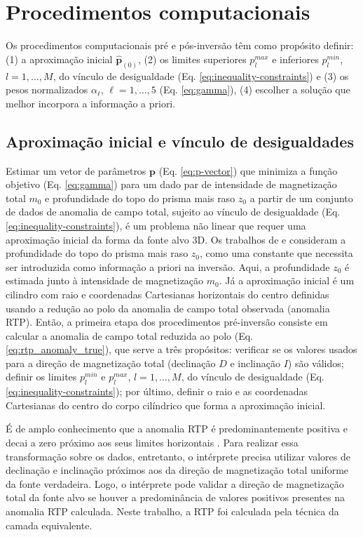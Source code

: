 \chapter{Procedimentos computacionais}

Os procedimentos computacionais pré e pós-inversão têm como propósito definir: (1) a aproximação inicial $ \hat{\mathbf{p}}_{(0)} $, (2) os limites superiores $ p_l^{max} $ e inferiores $ p_l^{min} $, $ l=1, \dots, M $, do vínculo de desigualdade (Eq. \ref{eq:inequality-constraints}) e (3) os pesos normalizados $ \alpha_{\ell} $, $ \ell=1,\dots,5 $ (Eq. \ref{eq:gamma}), (4) escolher a solução que melhor incorpora a informação a priori. 

\section{Aproximação inicial e vínculo de desigualdades}

Estimar um vetor de parâmetros $\mathbf{p}$ (Eq. \ref{eq:p-vector}) que minimiza a função objetivo (Eq. \ref{eq:gamma}) para um dado par de intensidade de magnetização total $ m_0 $ e profundidade do topo do prisma mais raso $ z_0 $ a partir de um conjunto de dados de anomalia de campo total, sujeito ao vínculo de desigualdade (Eq. \ref{eq:inequality-constraints}), é um problema não linear que requer uma aproximação inicial da forma da fonte alvo 3D. 
Os trabalhos de \cite{oliveirajr_etal2011} e \cite{oliveirajr_barbosa2013} consideram a profundidade do topo do prisma mais raso $ z_0 $, como uma constante que necessita ser introduzida como informação a priori na inversão.
Aqui, a profundidade $ z_0 $ é estimada junto à intensidade de magnetização $ m_0 $.
Já a aproximação inicial
é um cilindro com raio e coordenadas Cartesianas horizontais do centro definidas usando a redução ao polo da anomalia de campo total observada (anomalia RTP).
Então, a primeira etapa dos procedimentos pré-inversão consiste em calcular a anomalia de campo total reduzida ao polo (Eq. \ref{eq:rtp_anomaly_true}), que serve a três propósitos: verificar se os valores usados para a direção de magnetização total (declinação $D$ e inclinação $I$) são válidos; definir os limites $p_{l}^{min}$ e $p_{l}^{max}$, $ l=1, \dots, M $, do vínculo de desigualdade (Eq. \ref{eq:inequality-constraints}); por último, definir o raio e as coordenadas Cartesianas do centro do corpo cilíndrico que forma a aproximação inicial.

É de amplo conhecimento que a anomalia RTP é predominantemente positiva e decai a zero próximo aos seus limites horizontais \cite[por exemplo,][p. 331]{blakely1996}.
Para realizar essa transformação sobre os dados, entretanto, o intérprete precisa utilizar valores de declinação e inclinação próximos aos da direção de magnetização total uniforme da fonte verdadeira.
Logo, o intérprete pode validar a direção de magnetização total da fonte alvo se houver a predominância de valores positivos presentes na anomalia RTP calculada.
Neste trabalho, a RTP foi calculada pela técnica da camada equivalente.

